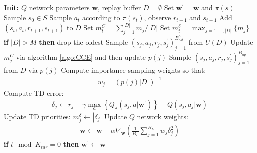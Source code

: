\documentclass[conference]{IEEEtran}
\newcommand{\spr}{s^{\prime}}
\begin{document}
\begin{algorithm}[H]
\caption{DQN with balanced consequence-error priority}\label{ABn}
\begin{algorithmic}[1]
\State \textbf{Init:} $Q$ network parameters $\mathbf{w}$, replay buffer $D=\emptyset$
\State Set $\mathbf{w}^{\prime}=\mathbf{w}$ and $\pi(s)$
\State Sample $s_0\in S$
\State Sample $a_t$ according to $\pi(s_t)$, observe $r_{t+1}$ and $s_{t+1}$
\State Add $(s_t,a_t,r_{t+1},s_{t+1})$ to $D$
\State Set $m^C_t = \sum_{j=1}^{|D|}m_j/|D|$
\State Set $m^{\delta}_t = \max_{j=1,\hdots,|D|}\{m_j\}$
\State \textbf{if} $|D|>M$ \textbf{then} drop the oldest
\State Sample $(s_j,a_j,r_j,\spr_j)_{j=1}^{B_{est}^C}$ from $U(D)$
\State Update $m^C_j$ via algorithm \ref{algo:CCE} and then update $p(j)$
\State Sample $(s_j,a_j,r_j,\spr_j)_{j=1}^{B_{up}}$ from $D$ via $p(j)$
\State Compute importance sampling weights so that:
\begin{align*}
    w_j = (p(j)|D|)^{-1}
\end{align*}
\State Compute TD error:
\begin{align*}
\delta_j \gets r_j + \gamma \max_a\left\{Q_{\pi}(\spr_j,a|\mathbf{w}^{\prime})\right\} - Q(s_j,a_j|\mathbf{w})
\end{align*}
\State Update TD priorities: $m_j^\delta \gets |\delta_j|$
\State Update $Q$ network weights:
\begin{align*}
\mathbf{w}\leftarrow \mathbf{w} - \alpha\nabla_{\mathbf{w}}\left(\frac{1}{B_L}\sum_{j=1}^{B_L}w_j\delta_j^2\right)
\end{align*}
\EndIf
\State \textbf{if} $t\mod K_{tar}=0$ \textbf{then} $\mathbf{w}^{\prime}\gets\mathbf{w}$
\EndFor
\end{algorithmic}
\end{algorithm}
\end{document}

